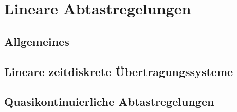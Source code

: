 \section{Lineare Abtastregelungen}


\subsection{Allgemeines}


\subsection{Lineare zeitdiskrete Übertragungssysteme}


\subsection{Quasikontinuierliche Abtastregelungen}

